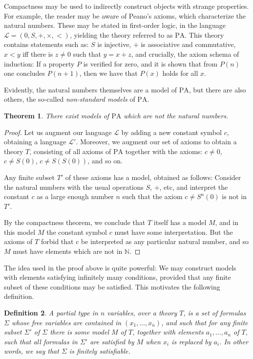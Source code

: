 \documentclass{article}
\newtheorem{theorem}{Theorem}[section]
\newtheorem{definition}[theorem]{Definition}
\theoremstyle{nonumberplain}
\newtheorem{proof}{Proof}
\newcommand{\N}{\mathbb{N}}
\newcommand{\Lang}{\mathcal{L}}
\begin{document}
Compactness may be used to indirectly construct objects with strange properties. For example, the reader may be aware of Peano's axioms, which characterize the natural numbers. These may be stated in first-order logic, in the language $\Lang = (0,S,+,\times,<)$, yielding the theory referred to as $\mathrm{PA}$. This theory contains statements such as: $S$ is injective, $+$ is associative and commutative, $x<y$ iff there is $z\neq 0$ such that $y=x+z$, and crucially, the axiom schema of induction: If a property $P$ is verified for zero, and it is shown that from $P(n)$ one concludes $P(n+1)$, then we have that $P(x)$ holds for all $x$.

Evidently, the natural numbers themselves are a model of $\mathrm{PA}$, but there are also others, the so-called \emph{non-standard models} of $\mathrm{PA}$.

\begin{theorem}\label{thm:nonstd}
There exist models of $\mathrm{PA}$ which are not the natural numbers.
\end{theorem}

\begin{proof}
Let us augment our language $\Lang$ by adding a new constant symbol $c$, obtaining a language $\Lang'$. Moreover, we augment our set of axioms to obtain a theory $T$, consisting of all axioms of $\mathrm{PA}$ together with the axioms: $c \neq 0$, $c \neq S(0)$, $c \neq S(S(0))$, and so on.

Any finite subset $T'$ of these axioms has a model, obtained as follows: Consider the natural numbers with the usual operations $S$, $+$, etc, and interpret the constant $c$ as a large enough number $n$ such that the axiom $c \neq S^n(0)$ is not in $T'$.

By the compactness theorem, we conclude that $T$ itself has a model $M$, and in this model $M$ the constant symbol $c$ must have some interpretation. But the axioms of $T$ forbid that $c$ be interpreted as any particular natural number, and so $M$ must have elements which are not in $\N$.
\end{proof}

The idea used in the proof above is quite powerful: We may construct models with elements satisfying infinitely many conditions, provided that any finite subset of these conditions may be satisfied. This motivates the following definition.

\begin{definition}
A partial type in $n$ variables, over a theory $T$, is a set of formulas $\Sigma$ whose free variables are contained in $(x_1, \dots, x_n)$, and such that for any finite subset $\Sigma'$ of $\Sigma$ there is some model $M$ of $T$, together with elements $a_1, \dots, a_n$ of $T$, such that all formulas in $\Sigma'$ are satisfied by $M$ when $x_i$ is replaced by $a_i$. In other words, we say that $\Sigma$ is \emph{finitely satisfiable}.
\end{definition}
\end{document}
